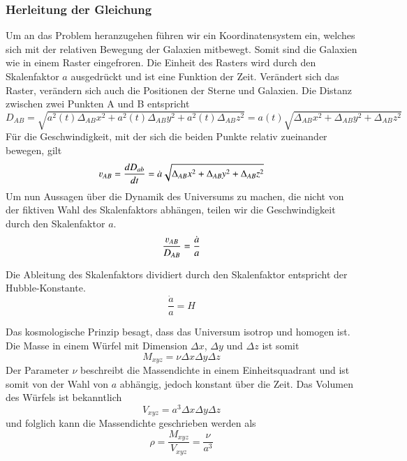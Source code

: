 \begin{refsection}
\subsubsection{Herleitung der Gleichung}
Um an das Problem heranzugehen führen wir ein Koordinatensystem ein, welches sich mit der relativen Bewegung der Galaxien mitbewegt. Somit sind die Galaxien wie in einem Raster eingefroren. Die Einheit des Rasters wird durch den Skalenfaktor $a$ ausgedrückt und ist eine Funktion der Zeit. Verändert sich das Raster, verändern sich auch die Positionen der Sterne und Galaxien.
Die Distanz zwischen zwei Punkten A und B entspricht 
\begin{equation}
D_{AB} = \sqrt{a^2(t)\Delta_{AB}x^2 + a^2(t)\Delta_{AB}y^2 + a^2(t)\Delta_{AB}z^2} = a(t) \sqrt{\Delta_{AB}x^2 + \Delta_{AB}y^2 + \Delta_{AB}z^2}
\end{equation}
F\"{u}r die Geschwindigkeit, mit der sich die beiden Punkte relativ zueinander bewegen, gilt 
\begin{equation}
\varv_{AB} = \dfrac{dD_{ab}}{dt} 
	   = \dot{a} \sqrt{\Delta_{AB}x^2 + \Delta_{AB}y^2 + \Delta_{AB}z^2}
\end{equation}
Um nun Aussagen über die Dynamik des Universums zu machen, die nicht von der fiktiven Wahl  des Skalenfaktors abhängen, teilen wir die Geschwindigkeit durch den Skalenfaktor $a$.
\begin{equation}
\frac{\varv_{AB} }{D_{AB}} = \frac{\dot{a}}{a}
\label{friedmann:geschwindigkeit}
\end{equation}
\begin{satz} 
	Die Ableitung des Skalenfaktors dividiert durch den Skalenfaktor entspricht der Hubble-Konstante.
	\[
	\frac{\dot{a}}{a} = H
	\]
\end{satz}
Das kosmologische Prinzip besagt, dass das Universum isotrop und homogen ist. Die Masse in einem Würfel mit Dimension $\Delta x$, $\Delta y$ und $\Delta z$ ist somit
\begin{equation}
M_{xyz} = \nu \Delta x \Delta y \Delta z
\end{equation}
Der Parameter $\nu$ beschreibt die Massendichte in einem Einheitsquadrant und ist somit von der Wahl von $a$ abhängig, jedoch konstant über die Zeit. Das Volumen des Würfels ist bekanntlich 
\begin{equation}
V_{xyz} = a^3 \Delta x \Delta y \Delta z
\end{equation}
und folglich kann die Massendichte geschrieben werden als
\begin{equation}
\rho = \frac{M_{xyz}}{V_{xyz}} = \frac{\nu}{a^3}
\label{friedmann:dichte}
\end{equation}

\end{refsection}
